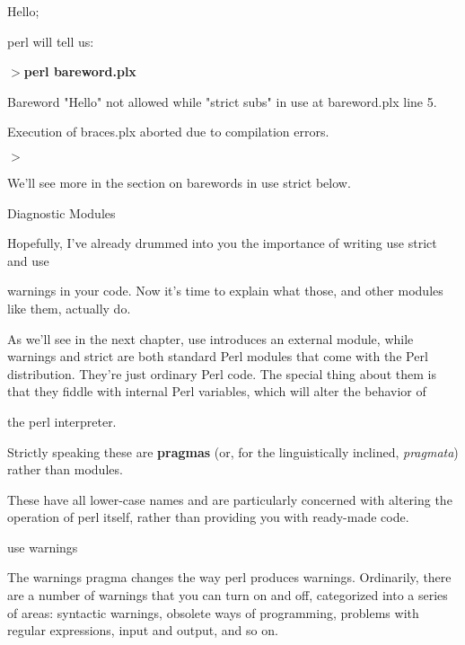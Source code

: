 \documentclass[a4paper,11pt]{book}
\begin{document}
\noindent 

\noindent Hello;

\noindent 

\noindent perl will tell us:

\noindent 

\noindent $>$\textbf{perl bareword.plx}

\noindent Bareword "Hello" not allowed while "strict subs" in use at bareword.plx line 5.

\noindent Execution of braces.plx aborted due to compilation errors.

\noindent $>$

\noindent 

\noindent We'll see more in the section on barewords in use strict below.

\noindent 

\noindent 

\noindent Diagnostic Modules

\noindent 

\noindent Hopefully, I've already drummed into you the importance of writing use strict and use

\noindent warnings in your code. Now it's time to explain what those, and other modules like them, actually do.

\noindent 

\noindent As we'll see in the next chapter, use introduces an external module, while warnings and strict are both standard Perl modules that come with the Perl distribution. They're just ordinary Perl code. The special thing about them is that they fiddle with internal Perl variables, which will alter the behavior of

\noindent the perl interpreter.

\noindent 

\noindent Strictly speaking these are \textbf{pragmas }(or, for the linguistically inclined, \textit{pragmata}) rather than modules.

\noindent These have all lower-case names and are particularly concerned with altering the operation of perl itself, rather than providing you with ready-made code.

\noindent 

\noindent 

\noindent use warnings

\noindent 

\noindent The warnings pragma changes the way perl produces warnings. Ordinarily, there are a number of warnings that you can turn on and off, categorized into a series of areas: syntactic warnings, obsolete ways of programming, problems with regular expressions, input and output, and so on.
\end{document}
